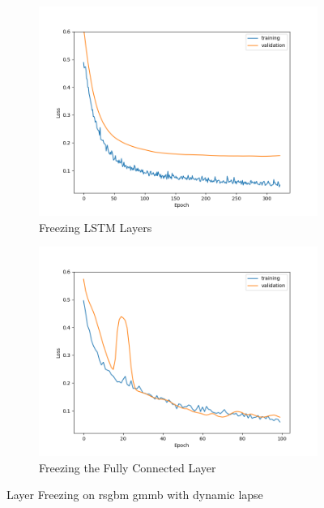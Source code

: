 \begin{figure}[ht!]
    \centering
    \begin{subfigure}{0.48\textwidth}
        \includegraphics[width=\textwidth]{./project3/figures/figure3a.png}
        \caption{Freezing LSTM Layers} 
        \label{subfig3-3:freezeLSTM}
    \end{subfigure}\hfill
    \begin{subfigure}{0.48\textwidth}
        \includegraphics[width=\textwidth]{./project3/figures/figure3b.png}
        \caption{Freezing the Fully Connected Layer}
        \label{subfig3-3:freezeFC}
    \end{subfigure}
    \caption{Layer Freezing on \gls{rsgbm} \gls{gmmb} with dynamic lapse}
    \label{fig3:figure3}
\end{figure}


